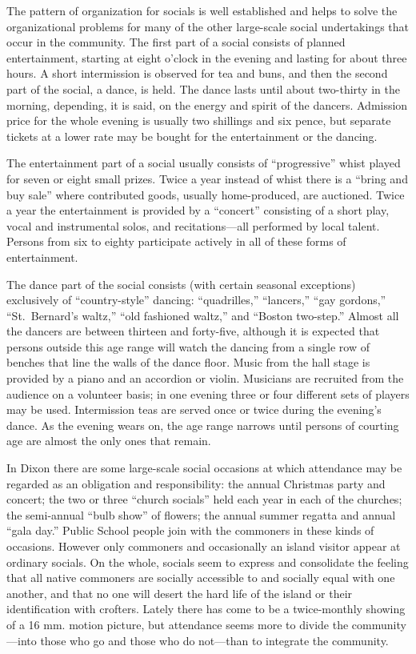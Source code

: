 \documentclass[openany,nobib]{tufte-book}
\begin{document}
The pattern of organization for socials is well established and helps to
solve the organizational problems for many of the other large-scale
social undertakings that occur in the community. The first part of a
social consists of planned entertainment, starting at eight o'clock in
the evening and lasting for about three hours. A short intermission is
observed for tea and buns, and then the second part of the social, a
dance, is held. The dance lasts until about two-thirty in the morning,
depending, it is said, on the energy and spirit of the dancers.
Admission price for the whole evening is usually two shillings and six
pence, but separate tickets at a lower rate may be bought for the
entertainment or the dancing.

The entertainment part of a social usually consists of ``progressive''
whist played for seven or eight small prizes. Twice a year instead of
whist there is a ``bring and buy sale'' where contributed goods, usually
home-produced, are auctioned. Twice a year the entertainment is provided
by a ``concert'' consisting of a short play, vocal and instrumental
solos, and recitations---all performed by local talent. Persons from six
to eighty participate actively in all of these forms of entertainment.

The dance part of the social consists (with certain seasonal exceptions)
exclusively of ``country-style'' dancing: ``quadrilles,'' ``lancers,''
``gay gordons,'' ``St.~Bernard's waltz,'' ``old fashioned waltz,'' and
``Boston two-step.'' Almost all the dancers are between thirteen and
forty-five, although it is expected that persons outside this age range
will watch the dancing from a single row of benches that line the walls
of the dance floor. Music from the hall stage is provided by a piano and
an accordion or violin. Musicians are recruited from the audience on a
volunteer basis; in one evening three or four different sets of players
may be used. Intermission teas are served once or twice during the
evening's dance. As the evening wears on, the age range narrows until
persons of courting age are almost the only ones that remain.

In Dixon there are some large-scale social occasions at which attendance
may be regarded as an obligation and responsibility: the annual
Christmas party and concert; the two or three ``church socials'' held
each year in each of the churches; the semi-annual ``bulb show'' of
flowers; the annual summer regatta and annual ``gala day.'' Public
School people join with the commoners in these kinds of occasions.
However only commoners and occasionally an island visitor appear at
ordinary socials. On the whole, socials seem to express and consolidate
the feeling that all native commoners are socially accessible to and
socially equal with one another, and that no one will desert the hard
life of the island or their identification with crofters. Lately there
has come to be a twice-monthly showing of a 16 mm. motion picture, but
attendance seems more to divide the community---into those who go and
those who do not---than to integrate the community.
\end{document}

